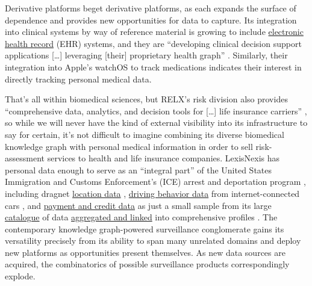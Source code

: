 Derivative platforms beget derivative platforms, as each expands the
surface of dependence and provides new opportunities for data to
capture. Its integration into clinical systems by way of reference
material is growing to include
\href{https://web.archive.org/web/20230307020432/https://www.elsevier.com/en-gb/clinical-solutions/clinical-practice}{electronic
health record} (EHR) systems, and they are ``developing clinical
decision support applications {[}\ldots{]} leveraging {[}their{]}
proprietary health graph'' \cite{relxAnnualReport20222023} .
Similarly, their integration into Apple's watchOS to track medications
indicates their interest in directly tracking personal medical data.

That's all within biomedical sciences, but RELX's risk division also
provides ``comprehensive data, analytics, and decision tools for
{[}\ldots{]} life insurance carriers'' \cite{relxAnnualReport20222023} , so while we will never have the kind of
external visibility into its infrastructure to say for certain, it's not
difficult to imagine combining its diverse biomedical knowledge graph
with personal medical information in order to sell risk-assessment
services to health and life insurance companies. LexisNexis has personal
data enough to serve as an ``integral part'' of the United States
Immigration and Customs Enforcement's (ICE) arrest and deportation
program \cite{biddleLexisNexisProvideGiant2021, biddleICESearchedLexisNexis2022} , including dragnet
\href{https://web.archive.org/web/20230308034123/https://risk.lexisnexis.com/products/accurint-trax}{location
data} \cite{lexisnexisrisksolutionsAccurintTraX} ,
\href{https://risk.lexisnexis.com/products/telematics-ondemand}{driving
behavior data} from internet-connected cars \cite{lexisnexisrisksolutionsTelematicsOnDemand} , and
\href{https://risk.lexisnexis.com/products/threatmetrix}{payment and
credit data} as just a small sample from its large
\href{https://web.archive.org/web/20230308034302/https://www.lexisnexis.com/pdf/AccurintForLegalProfessionals/24.pdf}{catalogue}
\cite{lexisnexisrisksolutionsAccurintLegalProfessionals2022}  of
data \href{https://risk.lexisnexis.com/our-technology/lexid}{aggregated
and linked} into comprehensive profiles \cite{lexisnexisrisksolutionsLexID} . The contemporary knowledge
graph-powered surveillance conglomerate gains its versatility precisely
from its ability to span many unrelated domains and deploy new platforms
as opportunities present themselves. As new data sources are acquired,
the combinatorics of possible surveillance products correspondingly
explode.

